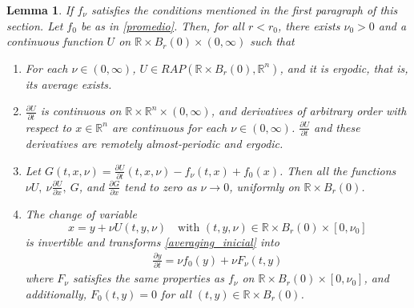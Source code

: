 \documentclass[english,reqno]{amsart}
\numberwithin{equation}{section}
\theoremstyle{plain}
\newtheorem{lem}[thm]{Lemma}
\theoremstyle{definition}
\theoremstyle{remark}
\begin{document}
\begin{lem}\label{lem_transformacion}
If $f_\nu$ satisfies the conditions mentioned in the first paragraph of this section.  
Let $f_0$ be as in \eqref{promedio}. Then, for all $r<r_0$, there exists $\nu_0>0$ and a continuous function $U$ on $\mathbb{R}\times B_{r}(0)\times (0,\infty)$ such that
\begin{enumerate}
\item For each $\nu\in(0,\infty)$, $U\in RAP(\mathbb{R}\times B_{r}(0),\mathbb{R}^n)$, and it is ergodic, that is, its average exists.

\item $\frac{\partial U}{\partial t}$ is continuous on $\mathbb{R}\times \mathbb{R}^n\times (0,\infty)$, and derivatives of arbitrary order with respect to $x\in\mathbb{R}^n$ are continuous for each $\nu\in (0,\infty)$.  
$\frac{\partial U}{\partial t}$ and these derivatives are remotely almost-periodic and ergodic.

\item Let $G(t,x,\nu)=\frac{\partial U}{\partial t}(t,x,\nu)-f_{\nu}(t,x)+f_{0}(x)$.  
Then all the functions $\nu U,\ \nu \frac{\partial U}{\partial x},\ G$, and $\frac{\partial G}{\partial x}$ tend to zero as $\nu\rightarrow 0$, uniformly on $\mathbb{R}\times B_{r}(0)$.

\item The change of variable  
\begin{equation}
x=y+\nu U(t,y,\nu) \quad \text{with } (t,y,\nu)\in\mathbb{R}\times B_{r}(0)\times [0,\nu_0] \label{cambio_variable}
\end{equation}  
is invertible and transforms \eqref{averaging_inicial} into  
\begin{eqnarray}
\frac{\partial y}{\partial t}=\nu f_{0}(y)+\nu F_{\nu}(t,y)\label{reducida}
\end{eqnarray}  
where $F_{\nu}$ satisfies the same properties as $f_{\nu}$ on $\mathbb{R}\times B_{r}(0)\times[0,\nu_{0}]$, and additionally, $F_{0}(t,y)=0$ for all $(t,y)\in\mathbb{R}\times B_{r}(0)$.
\end{enumerate}
\end{lem}
\end{document}

